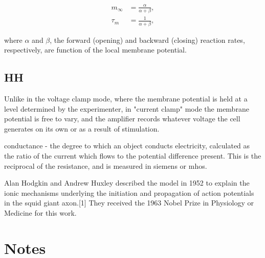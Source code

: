 \begin{align*}
    m_\infty &= \frac{\alpha}{\alpha + \beta},
    \\
    \tau_m &= \frac{1}{\alpha + \beta},
\end{align*}

where $\alpha$ and $\beta$, the forward (opening) and backward (closing) reaction rates, respectively, are function of the local membrane potential.

\subsection{HH}

Unlike in the voltage clamp mode, where the membrane potential is held at a level determined by the experimenter, in "current clamp" mode the membrane potential is free to vary, and the amplifier records whatever voltage the cell generates on its own or as a result of stimulation.

conductance - the degree to which an object conducts electricity, calculated as the ratio of the current which flows to the potential difference present. This is the reciprocal of the resistance, and is measured in siemens or mhos.

Alan Hodgkin and Andrew Huxley described the model in 1952 to explain the ionic mechanisms underlying the initiation and propagation of action potentials in the squid giant axon.[1] They received the 1963 Nobel Prize in Physiology or Medicine for this work.



\section{Notes}


